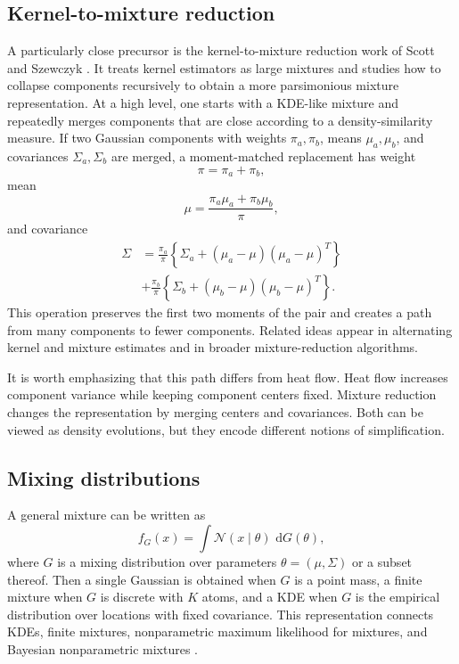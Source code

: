 \documentclass[preprint]{imsart}
\theoremstyle{plain}
\theoremstyle{definition}
\newcommand{\dd}{\,\mathrm{d}}
\newcommand{\Normal}{\mathcal{N}}
\begin{document}
\subsection{Kernel-to-mixture reduction}\label{subsec:kernel-to-mixture}

A particularly close precursor is the kernel-to-mixture reduction work of Scott and Szewczyk \citep{scott_2001_KernelsMixtures}. It treats kernel estimators as large mixtures and studies how to collapse components recursively to obtain a more parsimonious mixture representation. At a high level, one starts with a KDE-like mixture and repeatedly merges components that are close according to a density-similarity measure. If two Gaussian components with weights $\pi_a,\pi_b$, means $\mu_a,\mu_b$, and covariances $\Sigma_a,\Sigma_b$ are merged, a moment-matched replacement has weight
\[
  \pi=\pi_a+\pi_b,
\]
mean
\[
  \mu=\frac{\pi_a\mu_a+\pi_b\mu_b}{\pi},
\]
and covariance
\begin{align*}
  \Sigma
  &=\frac{\pi_a}{\pi}\left\{\Sigma_a+(\mu_a-\mu)(\mu_a-\mu)^T\right\}\\
  &+\frac{\pi_b}{\pi}\left\{\Sigma_b+(\mu_b-\mu)(\mu_b-\mu)^T\right\}.  
\end{align*}
This operation preserves the first two moments of the pair and creates a path from many components to fewer components. Related ideas appear in alternating kernel and mixture estimates \citep{priebe_2000_AlternatingKernelMixture} and in broader mixture-reduction algorithms.

It is worth emphasizing that this path differs from heat flow. Heat flow increases component variance while keeping component centers fixed. Mixture reduction changes the representation by merging centers and covariances. Both can be viewed as density evolutions, but they encode different notions of simplification.

\subsection{Mixing distributions}
\label{subsec:mixing-distributions}

A general mixture can be written as
\begin{equation*}
  f_G(x)=\int \Normal(x\mid \theta)\,\dd G(\theta),
\end{equation*}
where $G$ is a mixing distribution over parameters $\theta=(\mu,\Sigma)$ or a subset thereof. Then a single Gaussian is obtained when $G$ is a point mass, a finite mixture when $G$ is discrete with $K$ atoms, and a KDE when $G$ is the empirical distribution over locations with fixed covariance. This representation connects KDEs, finite mixtures, nonparametric maximum likelihood for mixtures, and Bayesian nonparametric mixtures  \citep{kiefer_1956_ConsistencyMaximumLikelihood, ferguson_1973_BayesianAnalysisNonparametric, lo_1984_ClassBayesianNonparametric, escobar_1995_BayesianDensityEstimation, lindsay_1995_MixtureModelsTheory}.
\end{document}
